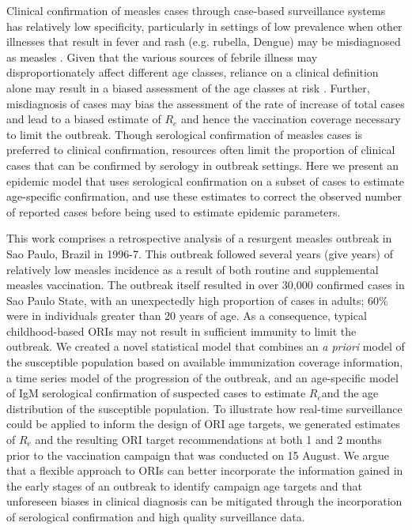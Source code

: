 Clinical confirmation of measles cases through case-based surveillance systems has relatively low specificity, particularly in settings of low prevalence \cite{Hutchins_2004,Ho_2014,GUY_2004,31c964} when other illnesses that result in fever and rash (e.g. rubella, Dengue) may be misdiagnosed as measles \cite{Ho_2014}. Given that the various sources of febrile illness may disproportionately affect different age classes, reliance on a clinical definition alone may result in a biased assessment of the age classes at risk \cite{Hutchins_2004,Durrheim_2014}. Further, misdiagnosis of
cases may bias the assessment of the rate of increase of total cases and lead to a biased estimate of \(R_{e}\) and hence the vaccination
coverage necessary to limit the outbreak. Though serological confirmation of measles cases is preferred to clinical confirmation,
resources often limit the proportion of clinical cases that can be confirmed by serology in outbreak settings. Here we present an epidemic
model that uses serological confirmation on a subset of cases to estimate age-specific confirmation, and use these estimates to correct the observed number of reported cases before being used to estimate epidemic parameters.

This work comprises a retrospective analysis of a resurgent measles outbreak in Sao Paulo, Brazil in 1996-7. This outbreak followed several years (give years) of relatively low measles incidence as a result of both routine and supplemental measles vaccination. The outbreak itself resulted in over 30,000 confirmed cases in Sao Paulo State, with an unexpectedly high proportion of cases in adults; 60\% were in individuals greater than 20
years of age. As a consequence, typical childhood-based ORIs may not result in sufficient immunity to limit the outbreak. We created a novel statistical model that combines an \emph{a priori} model of the susceptible population based on available immunization coverage information, a time series model of the progression of the outbreak, and an age-specific model of IgM serological confirmation of suspected cases to estimate \(R_{e}\)and the age distribution of the susceptible population. To illustrate how real-time surveillance could be applied to inform the design of ORI age targets, we generated estimates of \(R_{e}\) and the resulting ORI target recommendations at both 1 and 2 months prior to the vaccination campaign that was conducted on 15 August. We argue that a flexible approach to ORIs can better incorporate the information gained in the early stages of an
outbreak to identify campaign age targets and that unforeseen biases in clinical diagnosis can be mitigated through the incorporation of
serological confirmation and high quality surveillance data.